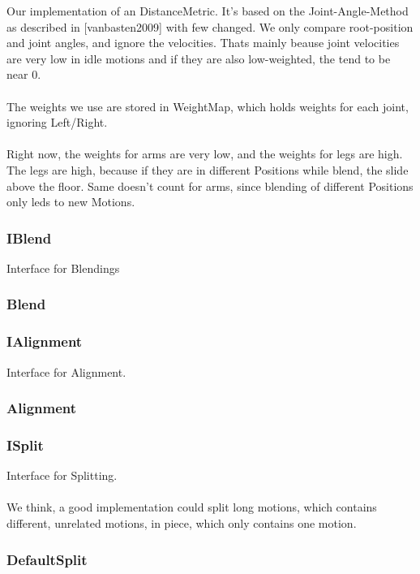 \documentclass[a4paper,10pt]{scrartcl}
\begin{document}
Our implementation of an DistanceMetric. It's based on the Joint-Angle-Method as described in [vanbasten2009] with few changed.
We only compare root-position and joint angles, and ignore the velocities. Thats mainly beause joint velocities are very low in idle motions and if they are also low-weighted, the tend to be near 0.
\\\\
The weights we use are stored in WeightMap, which holds weights for each joint, ignoring Left/Right.
\\\\
Right now, the weights for arms are very low, and the weights for legs are high.\\
The legs are high, because if they are in different Positions while blend, the slide above the floor. Same doesn't count for arms, since blending of different Positions only leds to new Motions.

\subsubsection{IBlend}

Interface for Blendings

\subsubsection{Blend}
\subsubsection{IAlignment}

Interface for Alignment.

\subsubsection{Alignment}

\subsubsection{ISplit}

Interface for Splitting.
\\\\
We think, a good implementation could split long motions, which contains different, unrelated motions, in piece, which only contains one motion.

\subsubsection{DefaultSplit}
\end{document}
